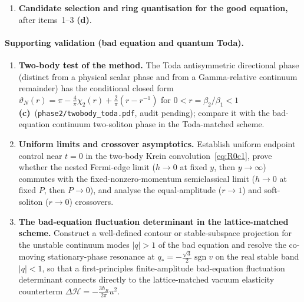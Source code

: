 \documentclass[11pt,a4paper]{article}
\newcommand{\lab}[1]{{\normalfont\sffamily\footnotesize\bfseries(#1)}}
\newcommand{\Lc}{\lab{c}}
\newcommand{\Ld}{\lab{d}}
\newcommand{\hb}{\hbar}
\newcommand{\sgn}{\operatorname{sgn}}
\theoremstyle{remark}
\begin{document}
\begin{enumerate}
\item \textbf{Candidate selection and ring quantisation for the good equation,} after items~1--3 \Ld.
\end{enumerate}

\paragraph{Supporting validation (bad equation and quantum Toda).}
\begin{enumerate}
\item[V1.] \textbf{Two-body test of the method.} The Toda antisymmetric directional phase (distinct from a physical scalar phase and from a Gamma-relative continuum remainder) has the conditional closed form $\vartheta_N(r)=\pi-\frac4\pi\chi_2(r)+\frac2\pi(r-r^{-1})$ for $0<r=\beta_2/\beta_1<1$ \Lc\ (\texttt{phase2/twobody\_toda.pdf}, audit pending); compare it with the bad-equation continuum two-soliton phase in the Toda-matched scheme.
\item[V2.] \textbf{Uniform limits and crossover asymptotics.} Establish uniform endpoint control near $t=0$ in the two-body Krein convolution~\eqref{eq:R0c1}, prove whether the nested Fermi-edge limit ($h\to0$ at fixed $y$, then $y\to\infty$) commutes with the fixed-nonzero-momentum semiclassical limit ($h\to0$ at fixed $P$, then $P\to0$), and analyse the equal-amplitude ($r\to1$) and soft-soliton ($r\to0$) crossovers.
\item[V3.] \textbf{The bad-equation fluctuation determinant in the lattice-matched scheme.} Construct a well-defined contour or stable-subspace projection for the unstable continuum modes $|q|>1$ of the bad equation and resolve the co-moving stationary-phase resonance at $q_*=-\frac{\sqrt3}2\sgn v$ on the real stable band $|q|<1$, so that a first-principles finite-amplitude bad-equation fluctuation determinant connects directly to the lattice-matched vacuum elasticity counterterm $\Delta\mathcal H=-\frac{3\hb_B}{2\pi}u^2$.
\end{enumerate}
\end{document}
